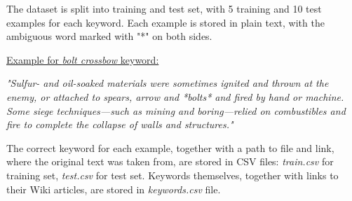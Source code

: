 \documentclass{llncs}
\begin{document}
The dataset is split into training and test set, with 5 training and 10 test examples for each keyword. Each example
is stored in plain text, with the ambiguous word marked with "*" on both sides.

\bigskip
\underline{Example for \textit{bolt crossbow} keyword:}

\textit{"Sulfur- and oil-soaked materials were sometimes ignited and thrown at the enemy, or attached to spears, arrow and
*bolts* and fired by hand or machine. Some siege techniques—such as mining and boring—relied on combustibles and
fire to complete the collapse of walls and structures."}

\bigskip
The correct keyword for each example, together with a path to file and link, where the original text was taken from,
are stored in CSV files: \textit{train.csv} for training set, \textit{test.csv} for test set. Keywords themselves,
together with links to their Wiki articles, are stored in \textit{keywords.csv} file.



\end{document}
